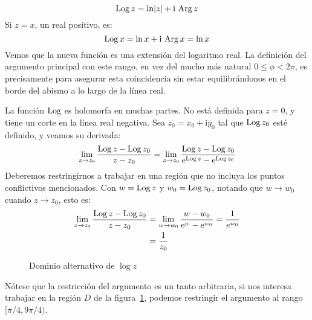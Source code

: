   \begin{equation}
    \label{eq:log-principal-branch}
    \operatorname{Log} z
      = \ln \lvert z \rvert + \mathrm{i} \, \operatorname{Arg} z
  \end{equation}
  Si \(z = x\),
  un real positivo,
  es:
  \begin{equation*}
    \operatorname{Log} x
      = \ln x + \mathrm{i} \, \operatorname{Arg} x
      = \ln x
  \end{equation*}
  Vemos que la nueva función es una extensión del logaritmo real.
  La definición del argumento principal con este rango,
  en vez del mucho más natural \(0 \le \phi < 2 \pi\),
  es precisamente para asegurar esta coincidencia
  sin estar equilibrándonos en el borde del abismo
  a lo largo de la línea real.

  La función \(\operatorname{Log}\) es holomorfa en muchas partes.
  No está definida para \(z = 0\),
  y tiene un corte en la línea real negativa.
  Sea \(z_0 = x_0 + \mathrm{i} y_0\)
  tal que \(\operatorname{Log} z_0\) esté definido,
  y veamos su derivada:
  \begin{equation*}
    \lim_{z \rightarrow z_0} \frac{\operatorname{Log} z - \operatorname{Log} z_0}{z - z_0}
      = \lim_{z \rightarrow z_0}
	  \frac{\operatorname{Log} z - \operatorname{Log} z_0}
	       {\mathrm{e}^{\operatorname{Log} z} - \mathrm{e}^{\operatorname{Log} z_0}}
  \end{equation*}
  Deberemos restringirnos a trabajar en una región
  que no incluya los puntos conflictivos mencionados.
  Con \(w = \operatorname{Log} z\) y \(w_0 = \operatorname{Log} z_0\),
  notando que \(w \rightarrow w_0\)
  cuando \(z \rightarrow z_0\),
  esto es:
  \begin{align*}
    \lim_{z \rightarrow z_0} \frac{\operatorname{Log} z - \operatorname{Log} z_0}{z - z_0}
      &= \lim_{w \rightarrow w_0}
	   \frac{w - w_0}{\mathrm{e}^w - \mathrm{e}^{w_0}}
       = \frac{1}{e^{w_0}} \\
      &= \frac{1}{z_0}
  \end{align*}

  \begin{figure}[ht]
    \centering
    \caption{Dominio alternativo de $\log z$}
    \label{fig:log-domain}
  \end{figure}
  Nótese que la restricción del argumento es un tanto arbitraria,
  si nos interesa trabajar en la región \(D\)
  de la figura~\ref{fig:log-domain},
  podemos restringir el argumento
  al rango \([\pi / 4,	9 \pi / 4)\).

